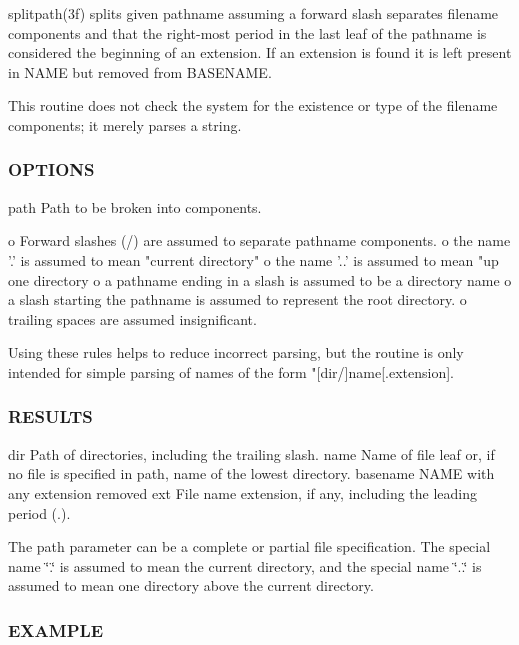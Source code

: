 splitpath(3f) splits given pathname assuming a forward slash separates filename components and that the right-\/most period in the last leaf of the pathname is considered the beginning of an extension. If an extension is found it is left present in N\+A\+ME but removed from B\+A\+S\+E\+N\+A\+ME.

This routine does not check the system for the existence or type of the filename components; it merely parses a string.

\subsubsection*{O\+P\+T\+I\+O\+NS}

path Path to be broken into components. \begin{DoxyVerb}      o Forward slashes (/) are assumed to separate pathname components.
      o the name '.' is assumed to mean "current directory"
      o the name '..' is assumed to mean "up one directory
      o a pathname ending in a slash is assumed to be a directory name
      o a slash starting the pathname is assumed to represent the root
        directory.
      o trailing spaces are assumed insignificant.
\end{DoxyVerb}


Using these rules helps to reduce incorrect parsing, but the routine is only intended for simple parsing of names of the form "\mbox{[}dir/\mbox{]}name\mbox{[}.extension\mbox{]}.

\subsubsection*{R\+E\+S\+U\+L\+TS}

dir Path of directories, including the trailing slash. name Name of file leaf or, if no file is specified in path, name of the lowest directory. basename N\+A\+ME with any extension removed ext File name extension, if any, including the leading period (.).

The path parameter can be a complete or partial file specification. The special name \char`\"{}.\char`\"{} is assumed to mean the current directory, and the special name \char`\"{}..\char`\"{} is assumed to mean one directory above the current directory.

\subsubsection*{E\+X\+A\+M\+P\+LE}

